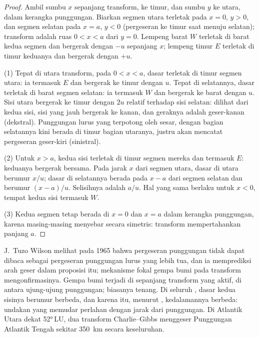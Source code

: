 \begin{proof}
Ambil sumbu $x$ sepanjang transform, ke timur, dan sumbu $y$ ke utara, dalam kerangka punggungan. Biarkan segmen utara terletak pada $x = 0$, $y > 0$, dan segmen selatan pada $x = a$, $y < 0$ (pergeseran ke timur saat menuju selatan); transform adalah ruas $0 < x < a$ dari $y = 0$. Lempeng barat $W$ terletak di barat kedua segmen dan bergerak dengan $-u$ sepanjang $x$; lempeng timur $E$ terletak di timur keduanya dan bergerak dengan $+u$.

(1) Tepat di utara transform, pada $0 < x < a$, dasar terletak di timur segmen utara: ia termasuk $E$ dan bergerak ke timur dengan $u$. Tepat di selatannya, dasar terletak di barat segmen selatan: ia termasuk $W$ dan bergerak ke barat dengan $u$. Sisi utara bergerak ke timur dengan $2u$ relatif terhadap sisi selatan: dilihat dari kedua sisi, sisi yang jauh bergerak ke kanan, dan geraknya adalah geser-kanan (dekstral). Punggungan lurus yang terpotong oleh sesar, dengan bagian selatannya kini berada di timur bagian utaranya, justru akan mencatat pergeseran geser-kiri (sinistral).

(2) Untuk $x > a$, kedua sisi terletak di timur segmen mereka dan termasuk $E$: keduanya bergerak bersama. Pada jarak $x$ dari segmen utara, dasar di utara  berumur $x/u$; dasar di selatannya berada pada $x - a$ dari segmen selatan dan berumur $(x - a)/u$. Selisihnya adalah $a/u$. Hal yang sama berlaku untuk $x < 0$, tempat kedua sisi termasuk $W$.

(3) Kedua segmen tetap berada di $x = 0$ dan $x = a$ dalam kerangka punggungan, karena masing-masing menyebar secara simetris: transform mempertahankan panjang $a$.
\end{proof}

J.\ Tuzo Wilson melihat pada 1965 bahwa pergeseran punggungan tidak dapat dibaca sebagai pergeseran punggungan lurus yang lebih tua, dan ia memprediksi arah geser dalam proposisi itu; mekanisme fokal gempa bumi pada transform mengonfirmasinya. Gempa bumi terjadi di sepanjang transform yang aktif, di antara ujung-ujung punggungan;  biasanya tenang. Di seluruh , dasar kedua sisinya berumur berbeda, dan karena itu, menurut , kedalamannya berbeda: undakan yang memudar perlahan dengan jarak dari punggungan. Di Atlantik Utara dekat \ang{52}\,LU, dua transform Charlie--Gibbs menggeser Punggungan Atlantik Tengah sekitar \qty{350}{km} secara keseluruhan.

